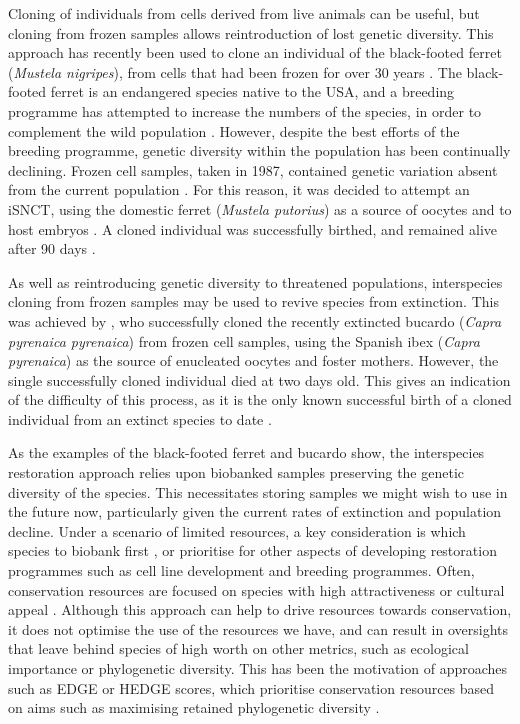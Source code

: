 \documentclass[12pt]{article}
\begin{document}
	Cloning of individuals from cells derived from live animals can be useful, but
	cloning from frozen samples allows reintroduction of lost genetic diversity.
	This approach has recently been used
	to clone an individual of the black-footed ferret (\textit{Mustela nigripes}),
	from cells that had been frozen for over 30 years
	\citep{frittsConservationFirstCloned2022}.
	The black-footed ferret is an endangered species native to the 
	USA, and a breeding programme has attempted
	to increase the numbers of the species, in order
	to complement the wild population \citep{sandlerEthicalAnalysisCloning2021}.
	However, despite the best efforts of the breeding
	programme, genetic diversity within the population has been continually declining.
	Frozen cell samples, taken in 1987, contained genetic variation
	absent from the current population \citep{frittsConservationFirstCloned2022}.
	For this reason, it was decided to attempt an iSNCT, using the domestic ferret
	(\textit{Mustela putorius}) as a source
	of oocytes and to host embryos \citep{wiselyRoadMap21st2015}.
	A cloned individual was successfully birthed, and
	remained alive after 90 days \citep{sandlerEthicalAnalysisCloning2021}.
	
	As well as reintroducing genetic diversity to threatened populations,
	interspecies cloning from frozen samples may be used to revive species
	from extinction. This was achieved by \citet{folchFirstBirthAnimal2009},
	who successfully cloned the recently extincted bucardo
	(\textit{Capra pyrenaica pyrenaica}) from frozen cell samples, using the
	Spanish ibex (\textit{Capra pyrenaica}) as the source of enucleated oocytes
	and foster mothers. However, the single successfully cloned individual
	died at two days old. This gives an indication of the difficulty of
	this process, as it is the only known successful birth of a cloned
	individual from an extinct species to date
	\citep{shapiroPathwaysDeextinctionHow2017}.
	
	As the examples of the black-footed ferret and bucardo show,
	the interspecies restoration approach
	relies upon biobanked samples preserving the genetic diversity of the species.
	This necessitates storing samples we might wish to use in the future now, particularly given the current
	rates of extinction and population decline. Under a scenario of limited resources,
	a key consideration is which species to biobank first \citep{harwoodDevelopingImplementingPrioritisation2021}, or prioritise for
	other aspects of developing restoration programmes such as cell
	line development and breeding programmes.
	Often, conservation resources are focused on species with high attractiveness or
	cultural appeal \citep{gunnthorsdottirPhysicalAttractivenessAnimal2001}. Although this approach can help to drive resources
	towards conservation, it does not optimise the use of the resources we have, 
	and can result in oversights that leave behind species of high worth on other
	metrics, such as ecological importance or phylogenetic diversity. This has been
	the motivation of approaches such as EDGE or HEDGE scores, which prioritise conservation 
	resources based on aims such as maximising retained phylogenetic diversity \citep{isaacMammalsEDGEConservation2007,steelHedgingOurBets2007}.
	
\end{document}
